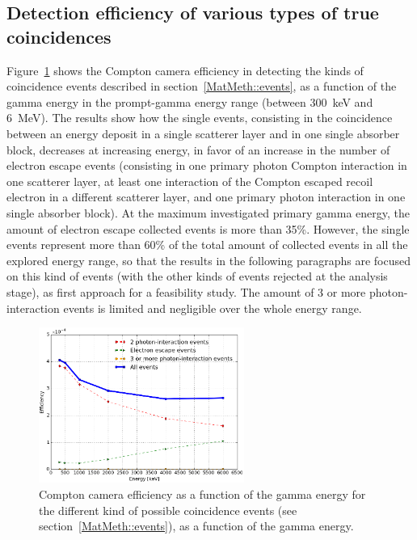 \subsection{Detection efficiency of various types of true coincidences}
\label{Results::relefficiency}
Figure~\ref{fig::eff_evKind} shows the Compton camera efficiency in detecting the kinds of coincidence events described in section~\ref{MatMeth::events}, as a function of the gamma energy in the prompt-gamma energy range (between 300~keV and 6~MeV). The results show how the single events, consisting in the coincidence between an energy deposit in a single scatterer layer and in one single absorber block, decreases at increasing energy, in favor of an increase in the number of electron escape events (consisting in one primary photon Compton interaction in one scatterer layer, at least one interaction of the Compton escaped recoil electron in a different scatterer layer, and one primary photon interaction in one single absorber block). At the maximum investigated primary gamma energy,  the amount of electron escape collected events is more than 35\%. However, the single events represent more than 60\% of the total amount of collected events in all the explored energy range, so that the results in the following paragraphs are focused on this kind of events (with the other kinds of events rejected at the analysis stage), as first approach for a feasibility study. The amount of 3 or more photon-interaction events is limited and negligible over the whole energy range.

\begin{figure} [!hbtp]	
\centering
\includegraphics[width=0.6\textwidth]{./Figure/new/effVSenergy_trigger.png}
\caption{Compton camera efficiency as a function of the gamma energy for the different kind of possible coincidence events (see section~\ref{MatMeth::events}), as a function of the gamma energy.}
\label{fig::eff_evKind}
\end{figure}

